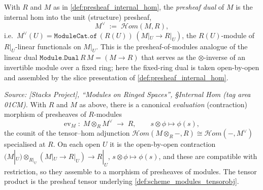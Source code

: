 \begin{definition}

  \label{def:presheaf_dual}
  With \(R\) and \(M\) as in \cref{def:presheaf_internal_hom}, the
  \emph{presheaf dual} of \(M\) is the internal hom into the unit (structure)
  presheaf,
  \[
    M^\vee \;:=\; \mathcal{H}om(M, R),
  \]
  i.e.\ \(M^\vee(U) = \mathtt{ModuleCat.of}\,(R(U))\,(M|_U \to R|_U)\), the
  \(R(U)\)-module of \(R|_U\)-linear functionals on \(M|_U\). This is the
  presheaf-of-modules analogue of the linear dual
  \(\mathtt{Module.Dual}\,R\,M = (M \to R)\) that serves as the \(\otimes\)-inverse of
  an invertible module over a fixed ring; here the fixed-ring dual is taken
  open-by-open and assembled by the slice presentation of
  \cref{def:presheaf_internal_hom}.
\end{definition}

\begin{lemma}

  \label{lem:internal_hom_eval}
  \textit{Source: [Stacks Project], ``Modules on Ringed Spaces'', \S Internal Hom
  (tag area 01CM).}
  With \(R\) and \(M\) as above, there is a canonical \emph{evaluation} (contraction)
  morphism of presheaves of \(R\)-modules
  \[
    \mathrm{ev}_M \;\colon\; M \otimes_R M^\vee \;\longrightarrow\; R,
    \qquad s \otimes \phi \longmapsto \phi(s),
  \]
  the counit of the tensor--hom adjunction
  \(\mathcal{H}om(M \otimes_R -, R) \cong \mathcal{H}om(-, M^\vee)\) specialised at
  \(R\). On each open \(U\) it is the open-by-open contraction
  \((M|_U) \otimes_{R|_U} (M|_U \to R|_U) \to R|_U\), \(s \otimes \phi \mapsto
  \phi(s)\), and these are compatible with restriction, so they assemble to a morphism
  of presheaves of modules. The tensor product is the presheaf tensor underlying
  \cref{def:scheme_modules_tensorobj}.
\end{lemma}

